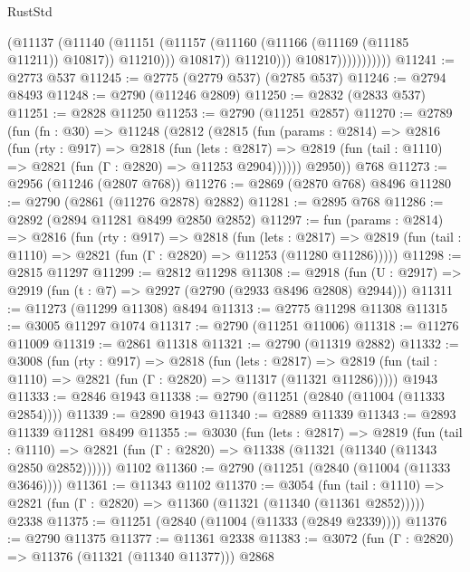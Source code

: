 \begin{lexlean}{RustStd}
\begin{coremodule}
{\begin{coremodule}
{{{{{{{{{{{{{{{{{{{{{{{{{{                                  (@11137
                                    (@11140
                                      (@11151
                                        (@11157
                                          (@11160 (@11166 (@11169 (@11185 @11211)) @10817))
                                          @11210)))
                                    @10817))
                                @11210)))
                          @10817)))))))))))
@11241 := @2773 @537
@11245 := @2775 (@2779 @537) (@2785 @537)
@11246 := @2794 @8493
@11248 := @2790 (@11246 @2809)
@11250 := @2832 (@2833 @537)
@11251 := @2828 @11250
@11253 := @2790 (@11251 @2857)
@11270 := @2789
    (fun (fn : @30) =>
    @11248
      (@2812
        (@2815
          (fun (params : @2814) =>
          @2816
            (fun (rty : @917) =>
            @2818
              (fun (lets : @2817) =>
              @2819 (fun (tail : @1110) => @2821 (fun (Γ : @2820) => @11253 @2904))))))
        @2950))
    @768
@11273 := @2956 (@11246 (@2807 @768))
@11276 := @2869 (@2870 @768) @8496
@11280 := @2790 (@2861 (@11276 @2878) @2882)
@11281 := @2895 @768
@11286 := @2892 (@2894 @11281 @8499 @2850 @2852)
@11297 := fun (params : @2814) =>
  @2816
    (fun (rty : @917) =>
    @2818
      (fun (lets : @2817) =>
      @2819 (fun (tail : @1110) => @2821 (fun (Γ : @2820) => @11253 (@11280 @11286)))))
@11298 := @2815 @11297
@11299 := @2812 @11298
@11308 := @2918 (fun (U : @2917) => @2919 (fun (t : @7) => @2927 (@2790 (@2933 @8496 @2808) @2944)))
@11311 := @11273 (@11299 @11308) @8494
@11313 := @2775 @11298 @11308
@11315 := @3005 @11297 @1074
@11317 := @2790 (@11251 @11006)
@11318 := @11276 @11009
@11319 := @2861 @11318
@11321 := @2790 (@11319 @2882)
@11332 := @3008
    (fun (rty : @917) =>
    @2818
      (fun (lets : @2817) =>
      @2819 (fun (tail : @1110) => @2821 (fun (Γ : @2820) => @11317 (@11321 @11286)))))
    @1943
@11333 := @2846 @1943
@11338 := @2790 (@11251 (@2840 (@11004 (@11333 @2854))))
@11339 := @2890 @1943
@11340 := @2889 @11339
@11343 := @2893 @11339 @11281 @8499
@11355 := @3030
    (fun (lets : @2817) =>
    @2819
      (fun (tail : @1110) =>
      @2821 (fun (Γ : @2820) => @11338 (@11321 (@11340 (@11343 @2850 @2852))))))
    @1102
@11360 := @2790 (@11251 (@2840 (@11004 (@11333 @3646))))
@11361 := @11343 @1102
@11370 := @3054
    (fun (tail : @1110) => @2821 (fun (Γ : @2820) => @11360 (@11321 (@11340 (@11361 @2852)))))
    @2338
@11375 := @11251 (@2840 (@11004 (@11333 (@2849 @2339))))
@11376 := @2790 @11375
@11377 := @11361 @2338
@11383 := @3072 (fun (Γ : @2820) => @11376 (@11321 (@11340 @11377))) @2868
}}}}}}}}}}}}}}}}}}}}}}}}}}
\end{coremodule}}
\end{coremodule}
\end{lexlean}
